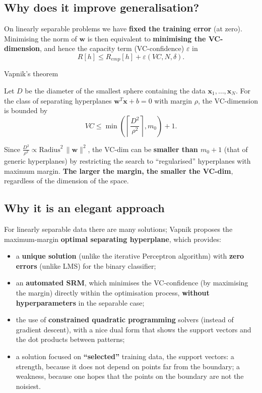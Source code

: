 \subsection{Why does it improve
generalisation?}\label{perchuxe9-migliora-la-generalizzazione}

On linearly separable problems we have \textbf{fixed the training
error} (at zero). Minimising the norm of \(\mathbf{w}\) is then
equivalent to \textbf{minimising the VC-dimension}, and hence the
capacity term (VC-confidence) \(\varepsilon\) in \[
R[h] \le R_{emp}[h] + \varepsilon(VC, N, \delta).
\]

\begin{boxtheorem}{Vapnik's theorem}

Let \(D\) be the diameter of the smallest sphere containing the data
\(\mathbf{x}_1,\dots,\mathbf{x}_N\). For the class of separating
hyperplanes \(\mathbf{w}^T\mathbf{x} + b = 0\) with margin \(\rho\),
the VC-dimension is bounded by \[
VC \le \min\left(\left\lceil\frac{D^2}{\rho^2}\right\rceil, m_0\right) + 1.
\]

\end{boxtheorem}

Since \(\frac{D^2}{\rho^2} \propto \text{Radius}^2\,\|\mathbf{w}\|^2\),
the VC-dim can be \textbf{smaller than \(m_0 + 1\)} (that of generic
hyperplanes) by restricting the search to ``regularised'' hyperplanes
with maximum margin. \textbf{The larger the margin, the smaller the
VC-dim}, regardless of the dimension of the space.

\subsection{Why it is an elegant
approach}\label{perchuxe9-uxe8-un-approccio-elegante}

For linearly separable data there are many solutions; Vapnik proposes
the maximum-margin \textbf{optimal separating hyperplane}, which
provides:

\begin{itemize}
\tightlist
\item
  a \textbf{unique solution} (unlike the iterative Perceptron
  algorithm) with \textbf{zero errors} (unlike LMS) for the binary
  classifier;
\item
  an \textbf{automated SRM}, which minimises the VC-confidence (by
  maximising the margin) directly within the optimisation process,
  \textbf{without hyperparameters} in the separable case;
\item
  the use of \textbf{constrained quadratic programming} solvers
  (instead of gradient descent), with a nice dual form that shows the
  support vectors and the dot products between patterns;
\item
  a solution focused on \textbf{``selected''} training data, the
  support vectors: a strength, because it does not depend on points far
  from the boundary; a weakness, because one hopes that the points on
  the boundary are not the noisiest.
\end{itemize}

